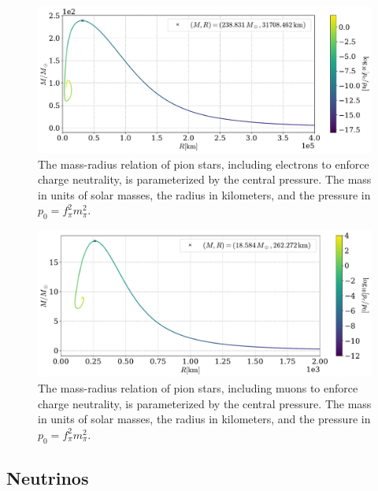 \begin{figure}[H]
    \centering
    \includegraphics[width=.85\textwidth]{../scripts/figurer/pion_star/mass_radius__e.pdf}
    \caption{
        The mass-radius relation of pion stars, including electrons to enforce charge neutrality, is parameterized by the central pressure.
        The mass in units of solar masses, the radius in kilometers, and the pressure in $p_0 = f_\pi^2 m_\pi^2$.
        }
        \label{fig: mass-radius relation with electrons}
\end{figure}

\begin{figure}[H]
    \centering
    \includegraphics[width=.85\textwidth]{../scripts/figurer/pion_star/mass_radius__mu.pdf}
    \caption{
        The mass-radius relation of pion stars, including muons to enforce charge neutrality, is parameterized by the central pressure.
        The mass in units of solar masses, the radius in kilometers, and the pressure in $p_0 = f_\pi^2 m_\pi^2$.
        }
        \label{fig: mass-radius relation with muons}
\end{figure}




\subsection{Neutrinos}

